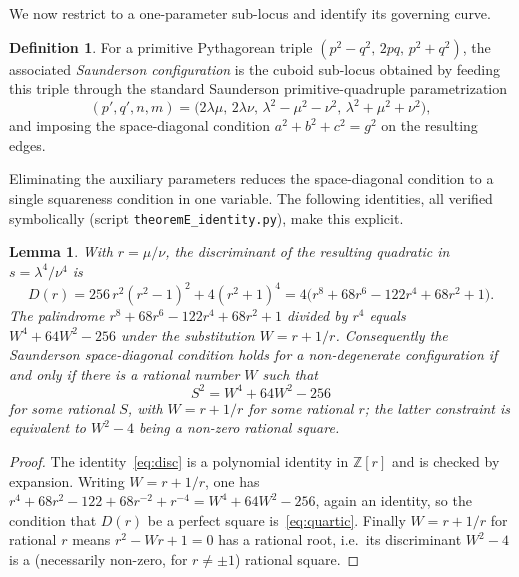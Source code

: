 \documentclass[11pt,reqno]{amsart}
\theoremstyle{plain}
\newtheorem{lemma}{Lemma}
\theoremstyle{definition}
\newtheorem{definition}{Definition}
\newcommand{\Z}{\mathbb{Z}}
\begin{document}
We now restrict to a one-parameter sub-locus and identify its governing curve.

\begin{definition}\label{def:saunderson}
For a primitive Pythagorean triple $(p^2-q^2,\,2pq,\,p^2+q^2)$, the associated
\emph{Saunderson configuration} is the cuboid sub-locus obtained by feeding this
triple through the standard Saunderson primitive-quadruple parametrization
\[
   (p',q',n,m)=\bigl(2\lambda\mu,\,2\lambda\nu,\,
   \lambda^2-\mu^2-\nu^2,\,\lambda^2+\mu^2+\nu^2\bigr),
\]
and imposing the space-diagonal condition $a^2+b^2+c^2=g^2$ on the resulting
edges.
\end{definition}

Eliminating the auxiliary parameters reduces the space-diagonal condition to a
single squareness condition in one variable. The following identities, all
verified symbolically (script \texttt{theoremE\_identity.py}), make this
explicit.

\begin{lemma}\label{lem:palindrome}
With $r=\mu/\nu$, the discriminant of the resulting quadratic in
$s=\lambda^4/\nu^4$ is
\begin{equation}\label{eq:disc}
   D(r)=256\,r^2(r^2-1)^2+4(r^2+1)^4
       =4\bigl(r^8+68r^6-122r^4+68r^2+1\bigr).
\end{equation}
The palindrome $r^8+68r^6-122r^4+68r^2+1$ divided by $r^4$ equals
$W^4+64W^2-256$ under the substitution $W=r+1/r$. Consequently the
Saunderson space-diagonal condition holds for a non-degenerate configuration if
and only if there is a rational number $W$ such that
\begin{equation}\label{eq:quartic}
   S^2=W^4+64W^2-256
\end{equation}
for some rational $S$, with $W=r+1/r$ for some rational $r$; the latter
constraint is equivalent to $W^2-4$ being a non-zero rational square.
\end{lemma}

\begin{proof}
The identity~\eqref{eq:disc} is a polynomial identity in $\Z[r]$ and is checked
by expansion. Writing $W=r+1/r$, one has
$r^4+68r^2-122+68r^{-2}+r^{-4}=W^4+64W^2-256$, again an identity, so the
condition that $D(r)$ be a perfect square is~\eqref{eq:quartic}. Finally $W=r+1/r$
for rational $r$ means $r^2-Wr+1=0$ has a rational root, i.e.\ its discriminant
$W^2-4$ is a (necessarily non-zero, for $r\neq\pm1$) rational square.
\end{proof}
\end{document}
